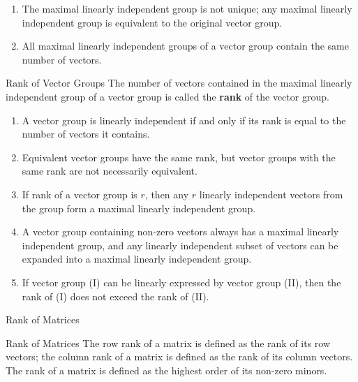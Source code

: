 \documentclass[11pt]{../../TexTemplate/elegantbook} %
\begin{document}
\begin{property}
    \begin{enumerate}
    \item The maximal linearly independent group is not unique; 
        any maximal linearly independent group is equivalent to the original vector group.
    \item All maximal linearly independent groups of a vector group contain the same number of vectors.
\end{enumerate}
\end{property}

\begin{definition}{Rank of Vector Groups}
    The number of vectors contained in the maximal linearly independent group of a vector group 
    is called the \textbf{rank} of the vector group.
\end{definition}

\begin{property}
    \begin{enumerate}
    \item A vector group is linearly independent if and only if its rank is equal to the number of vectors it contains.

    \item Equivalent vector groups have the same rank, but vector groups with the same rank are not necessarily equivalent.

    \item If rank of a vector group is \( r \), 
        then any \( r \) linearly independent vectors from the group form a maximal linearly independent group.

    \item A vector group containing non-zero vectors always has a maximal linearly independent group, 
        and any linearly independent subset of vectors can be expanded into a maximal linearly independent group.

    \item If vector group (I) can be linearly expressed by vector group (II), then the rank of (I) does not exceed the rank of (II).
\end{enumerate}
\end{property}




\begin{leftbarTitle}{Rank of Matrices}\end{leftbarTitle}
\begin{definition}{Rank of Matrices}
    The row rank of a matrix is defined as the rank of its row vectors;
    the column rank of a matrix is defined as the rank of its column vectors. 
    The rank of a matrix is defined as the highest order of its non-zero minors.
\end{definition}
\end{document}
